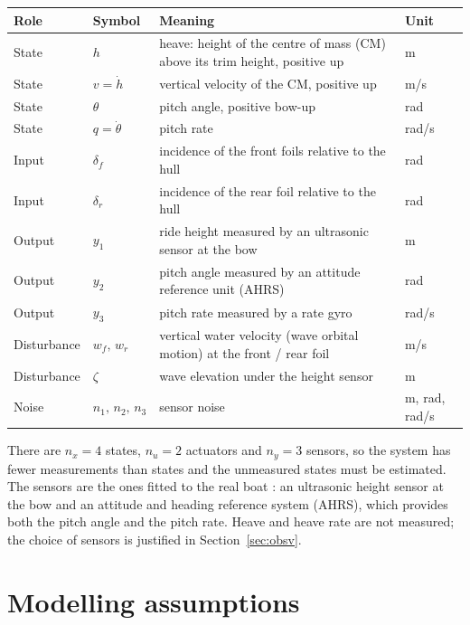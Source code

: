 \documentclass[11pt,a4paper]{article}
\newcommand{\df}{\delta_f}
\newcommand{\dr}{\delta_r}
\begin{document}
\begin{table}[h]
\centering
\begin{tabular}{@{}llp{8.4cm}l@{}}
\toprule
Role & Symbol & Meaning & Unit \\ \midrule
State & $h$ & heave: height of the centre of mass (CM) above its trim height, positive up & \si{m} \\
State & $v=\dot h$ & vertical velocity of the CM, positive up & \si{m/s} \\
State & $\theta$ & pitch angle, positive bow-up & \si{rad} \\
State & $q=\dot\theta$ & pitch rate & \si{rad/s} \\
Input & $\df$ & incidence of the front foils relative to the hull & \si{rad} \\
Input & $\dr$ & incidence of the rear foil relative to the hull & \si{rad} \\
Output & $y_1$ & ride height measured by an ultrasonic sensor at the bow & \si{m} \\
Output & $y_2$ & pitch angle measured by an attitude reference unit (AHRS) & \si{rad} \\
Output & $y_3$ & pitch rate measured by a rate gyro & \si{rad/s} \\
Disturbance & $w_f,\,w_r$ & vertical water velocity (wave orbital motion) at the front / rear foil & \si{m/s} \\
Disturbance & $\zeta$ & wave elevation under the height sensor & \si{m} \\
Noise & $n_1,\,n_2,\,n_3$ & sensor noise & \si{m}, \si{rad}, \si{rad/s} \\
\bottomrule
\end{tabular}
\end{table}

There are $n_x=4$ states, $n_u=2$ actuators and $n_y=3$ sensors, so the system has
fewer measurements than states and the unmeasured states must be estimated. The
sensors are the ones fitted to the real boat \cite{belime}: an ultrasonic height
sensor at the bow and an attitude and heading reference system (AHRS), which
provides both the pitch angle and the pitch rate. Heave and heave rate are not
measured; the choice of sensors is justified in Section~\ref{sec:obsv}.

\section{Modelling assumptions}
\label{sec:assumptions}
\end{document}
